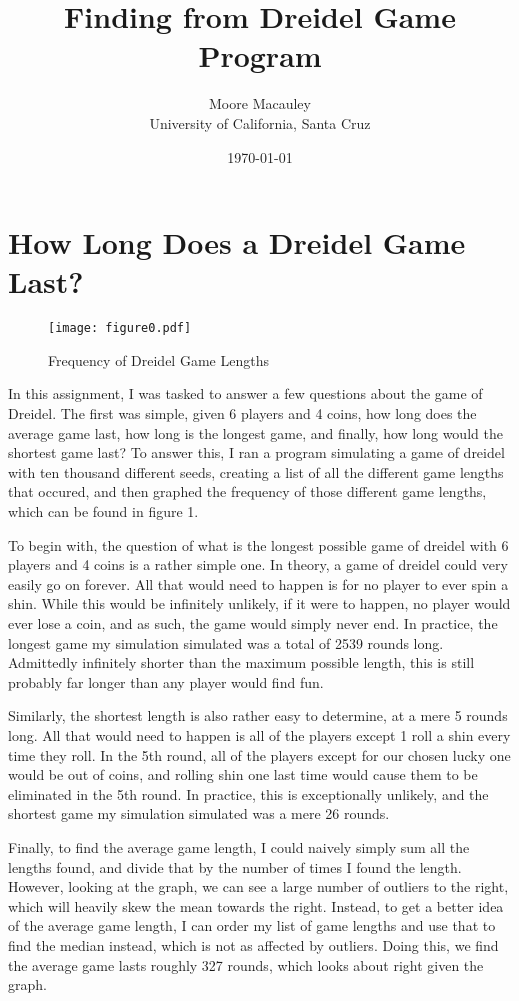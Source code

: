 \documentclass[11pt]{article}
\title{Finding from Dreidel Game Program}
\author{Moore Macauley \\ University of California, Santa Cruz}
\date{\today}
\begin{document}
\maketitle
\section{How Long Does a Dreidel Game Last?}

\begin{figure}[tbp]
\begin{centering}
\texttt{[image: figure0.pdf]}
\caption{Frequency of Dreidel Game Lengths}
\end{centering}
\end{figure}

In this assignment, I was tasked to answer a few questions about the game of Dreidel. The first was simple, given 6 players and 4 coins, how long does the average game last, how long is the longest game, and finally, how long would the shortest game last? To answer this, I ran a program simulating a game of dreidel with ten thousand different seeds, creating a list of all the different game lengths that occured, and then graphed the frequency of those different game lengths, which can be found in figure 1.

To begin with, the question of what is the longest possible game of dreidel with 6 players and 4 coins is a rather simple one. In theory, a game of dreidel could very easily go on forever. All that would need to happen is for no player to ever spin a shin. While this would be infinitely unlikely, if it were to happen, no player would ever lose a coin, and as such, the game would simply never end. In practice, the longest game my simulation simulated was a total of 2539 rounds long. Admittedly infinitely shorter than the maximum possible length, this is still probably far longer than any player would find fun.

Similarly, the shortest length is also rather easy to determine, at a mere 5 rounds long. All that would need to happen is all of the players except 1 roll a shin every time they roll. In the 5th round, all of the players except for our chosen lucky one would be out of coins, and rolling shin one last time would cause them to be eliminated in the 5th round. In practice, this is exceptionally unlikely, and the shortest game my simulation simulated was a mere 26 rounds.


Finally, to find the average game length, I could naively simply sum all the lengths found, and divide that by the number of times I found the length. However, looking at the graph, we can see a large number of outliers to the right, which will heavily skew the mean towards the right. Instead, to get a better idea of the average game length, I can order my list of game lengths and use that to find the median instead, which is not as affected by outliers. Doing this, we find the average game lasts roughly 327 rounds, which looks about right given the graph.
\end{document}
